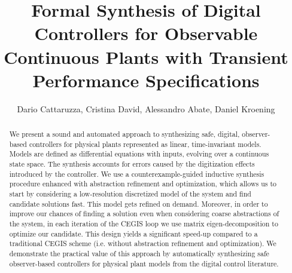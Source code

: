 \documentclass[sigconf]{llncs}
\begin{document}
\title{Formal Synthesis of Digital Controllers for Observable Continuous
Plants with Transient Performance Specifications}

\author{Dario Cattaruzza, Cristina David, Alessandro Abate, Daniel Kroening}%



\maketitle


\begin{abstract} 
%
We present a sound and automated approach to synthesizing safe,
digital, observer-based controllers for physical plants represented as
linear, time-invariant models.  Models are defined as differential
equations with inputs, evolving over a continuous state space. The
synthesis accounts for errors caused by the digitization effects
introduced by the controller.  We use a counterexample-guided
inductive synthesis procedure enhanced with abstraction
refinement and optimization, which allows us to start by considering
a low-resolution discretized model of the system and %
find candidate solutions fast. This model gets refined on demand.
Moreover, in order to improve our chances of finding a solution even
when considering coarse abstractions of the system, in each iteration of the CEGIS
loop we use matrix eigen-decomposition to optimize our candidate.
This design yields a significant speed-up compared to a traditional
CEGIS scheme (i.e. without abstraction refinement and optimization).
We demonstrate the practical value of this approach by automatically
synthesizing safe observer-based controllers for physical plant models
from the digital control literature.
%
\end{abstract}
\end{document}
